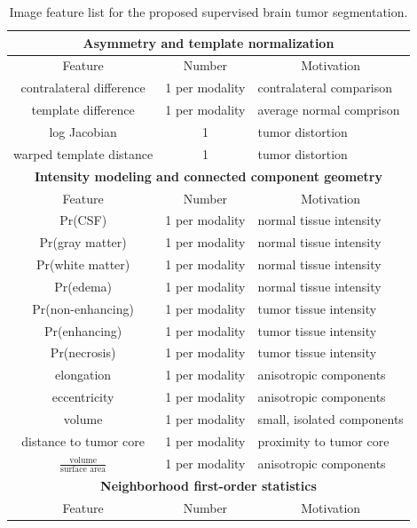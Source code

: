 \begin{table}
\caption{Image feature list for the proposed supervised brain tumor segmentation.}
\label{table:features}
\centering
\begin{tabular*}{0.99\textwidth}{@{\extracolsep{\fill}} c c l}
\toprule
\multicolumn{3}{c}{\bf Asymmetry and template normalization} \\
\midrule
\multicolumn{1}{c}{Feature} & \multicolumn{1}{c}{Number} & \multicolumn{1}{c}{Motivation} \\
\midrule
contralateral difference & 1 per modality & contralateral comparison \\
template difference  & 1 per modality & average normal comprison\\
log Jacobian &  1 & tumor distortion \\
warped template distance & 1 & tumor distortion \\
\midrule
\multicolumn{3}{c}{\bf Intensity modeling and connected component geometry} \\
\midrule
\multicolumn{1}{c}{Feature} & \multicolumn{1}{c}{Number} & \multicolumn{1}{c}{Motivation} \\
\midrule
Pr(CSF)  & 1 per modality & normal tissue intensity\\
Pr(gray matter) & 1 per modality & normal tissue intensity\\
Pr(white matter) & 1 per modality & normal tissue intensity\\
Pr(edema) & 1 per modality & normal tissue intensity\\
Pr(non-enhancing) & 1 per modality & tumor tissue intensity\\
Pr(enhancing) & 1 per modality & tumor tissue intensity\\
Pr(necrosis) & 1 per modality & tumor tissue intensity\\
elongation & 1 per modality & anisotropic components \\
eccentricity & 1 per modality & anisotropic components \\
volume & 1 per modality & small, isolated components \\
distance to tumor core & 1 per modality & proximity to tumor core \\
$\frac{\mathrm{volume}}{\mathrm{surface\,\,area}}$ & 1 per modality & anisotropic components \\
\midrule
\multicolumn{3}{c}{\bf Neighborhood first-order statistics} \\
\midrule
\multicolumn{1}{c}{Feature} & \multicolumn{1}{c}{Number} & \multicolumn{1}{c}{Motivation} \\

\end{tabular*}
\end{table}
